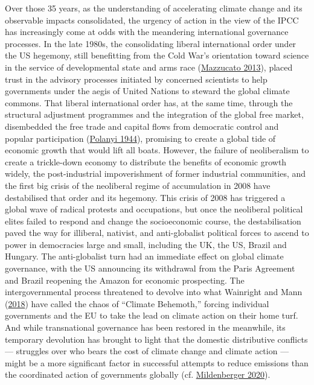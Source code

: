 \documentclass[a4paper, nobind]{templates/ociamthesis}
\begin{document}
Over those 35 years, as the understanding of accelerating climate change and its observable impacts consolidated, the urgency of action in the view of the IPCC has increasingly come at odds with the meandering international governance processes. In the late 1980s, the consolidating liberal international order under the US hegemony, still benefitting from the Cold War's orientation toward science in the service of developmental state and arms race (\protect\hyperlink{ref-mazzucato_entrepreneurial_2013}{Mazzucato 2013}), placed trust in the advisory processes initiated by concerned scientists to help governments under the aegis of United Nations to steward the global climate commons. That liberal international order has, at the same time, through the structural adjustment programmes and the integration of the global free market, disembedded the free trade and capital flows from democratic control and popular participation (\protect\hyperlink{ref-polanyi_great_1944}{Polanyi 1944}), promising to create a global tide of economic growth that would lift all boats. However, the failure of neoliberalism to create a trickle-down economy to distribute the benefits of economic growth widely, the post-industrial impoverishment of former industrial communities, and the first big crisis of the neoliberal regime of accumulation in 2008 have destabilised that order and its hegemony. This crisis of 2008 has triggered a global wave of radical protests and occupations, but once the neoliberal political elites failed to respond and change the socioeconomic course, the destabilisation paved the way for illiberal, nativist, and anti-globalist political forces to ascend to power in democracies large and small, including the UK, the US, Brazil and Hungary. The anti-globalist turn had an immediate effect on global climate governance, with the US announcing its withdrawal from the Paris Agreement and Brazil reopening the Amazon for economic prospecting. The intergovernmental process threatened to devolve into what Wainright and Mann (\protect\hyperlink{ref-wainwright_climate_2018}{2018}) have called the chaos of ``Climate Behemoth,'' forcing individual governments and the EU to take the lead on climate action on their home turf. And while transnational governance has been restored in the meanwhile, its temporary devolution has brought to light that the domestic distributive conflicts --- struggles over who bears the cost of climate change and climate action --- might be a more significant factor in successful attempts to reduce emissions than the coordinated action of governments globally (cf. \protect\hyperlink{ref-mildenberger_carbon_2020}{Mildenberger 2020}).
\end{document}
